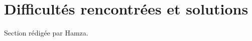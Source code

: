 \chapter{Difficultés rencontrées et solutions}

\begin{afaire}
  Section rédigée par Hamza.
\end{afaire}
